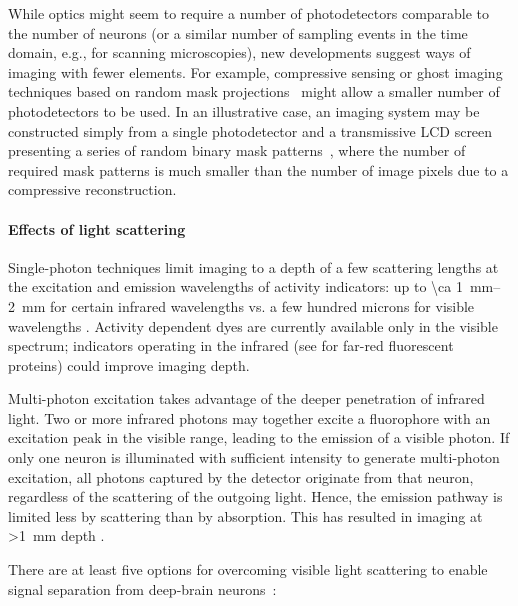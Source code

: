 While optics might seem to require a number of photodetectors comparable to the number of neurons (or a similar number of sampling events in the time domain, e.g., for scanning microscopies), new developments suggest ways of imaging with fewer elements.
For example, compressive sensing or ghost imaging techniques based on random mask projections~\cite{wakin06,studer12,tian11,sun13} might allow a smaller number of photodetectors to be used.
In an illustrative case, an imaging system may be constructed simply from a single photodetector and a transmissive LCD screen presenting a series of random binary mask patterns~\cite{huang13}, where the number of required mask patterns is much smaller than the number of image pixels due to a compressive reconstruction.

\paragraph{Effects of light scattering}
Single-photon techniques limit imaging to a depth of a few scattering lengths at the excitation and emission wavelengths of activity indicators: up to \SIrange{\ca 1}{2}{\milli\meter} for certain infrared wavelengths \cite{horton13,kobat09,Kobat2011} vs. a few hundred microns for visible wavelengths \cite{Wilt2009}.
Activity dependent dyes are currently available only in the visible spectrum; indicators operating in the infrared (see \cite{filonov11,shcherbakova13, Shcherbo2009} for far-red fluorescent proteins) could improve imaging depth.

Multi-photon excitation takes advantage of the deeper penetration of infrared light.
Two or more infrared photons may together excite a fluorophore with an excitation peak in the visible range, leading to the emission of a visible photon.
If only one neuron is illuminated with sufficient intensity to generate multi-photon excitation, all photons captured by the detector originate from that neuron, regardless of the scattering of the outgoing light. Hence, the emission pathway is limited less by scattering than by absorption.
This has resulted in imaging at \SI{>1}{\milli\meter} depth \cite{horton13,kobat09, Kobat2011}.

There are at least five options for overcoming visible light scattering to enable signal separation from deep-brain neurons~\cite{alivisatos2012brain, alivisatos13}:

